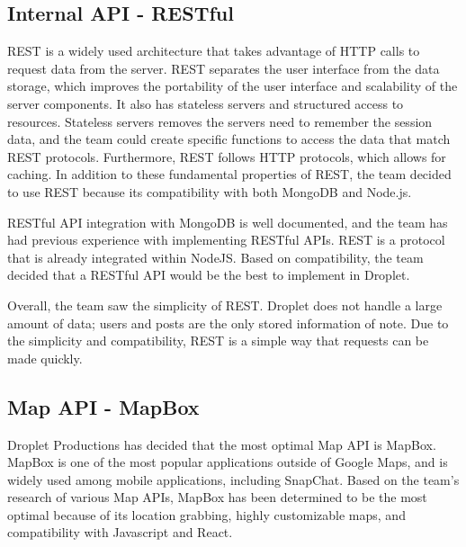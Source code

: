 \documentclass[draftclsnofoot, onecolumn, letterpaper,10pt,compsoc]{IEEEtran}
\begin{document}
\subsection{Internal API - RESTful}

REST is a widely used architecture that takes advantage of HTTP calls to request data from the server. REST separates the user interface from the data storage, which improves the portability of the user interface and scalability of the server components. It also has stateless servers and structured access to resources. Stateless servers removes the servers need to remember the session data, and the team could create specific functions to access the data that match REST protocols. Furthermore, REST follows HTTP protocols, which allows for caching. In addition to these fundamental properties of REST, the team decided to use REST because its compatibility with both MongoDB and Node.js. \cite{restcompatability}

RESTful API integration with MongoDB is well documented, and the team has had previous experience with implementing RESTful APIs. REST is a protocol that is already integrated within NodeJS. Based on compatibility, the team decided that a RESTful API would be the best to implement in Droplet.

Overall, the team saw the simplicity of REST. Droplet does not handle a large amount of data; users and posts are the only stored information of note. Due to the simplicity and compatibility, REST is a simple way that requests can be made quickly.


\subsection{Map API - MapBox}
Droplet Productions has decided that the most optimal Map API is MapBox. MapBox is one of the most popular applications outside of Google Maps, and is widely used among mobile applications, including SnapChat. Based on the team's research of various Map APIs, MapBox has been determined to be the most optimal because of its location grabbing, highly customizable maps, and compatibility with Javascript and React.
\end{document}
